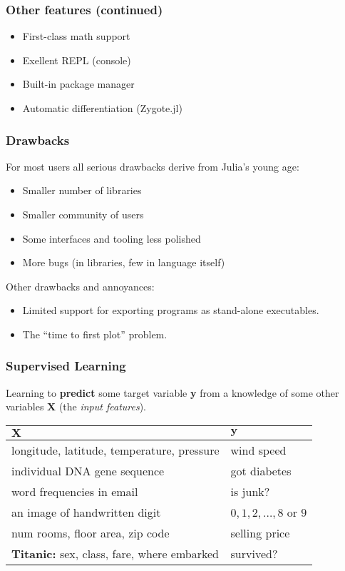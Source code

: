 \documentclass[t]{beamer}
\newcommand\df{\bf\color{Maroon}}
\begin{document}
\begin{frame}
  \frametitle{Other features (continued)}
  \begin{itemize}
  \item First-class math support
    \item Exellent REPL (console)
    \item Built-in package manager
    \item Automatic differentiation (Zygote.jl)
  \end{itemize}
\end{frame}

\begin{frame}
  \frametitle{Drawbacks}
  For most users all serious drawbacks derive from Julia's young age:
  \begin{itemize}
     \item Smaller number of libraries
     \item Smaller community of users
     \item Some interfaces and tooling less polished
     \item More bugs (in libraries, few in language itself)
  \end{itemize}
  Other drawbacks and annoyances:
  \begin{itemize}
     \item Limited support for exporting programs as stand-alone executables.
     \item The ``time to first plot'' problem.
  \end{itemize}
\end{frame}



\fi

\begin{frame}
  \frametitle{Supervised Learning}
  Learning to {\df predict} some target variable {\df\large y} from a
  knowledge of some other variables {\df \large X} (the {\it input features}).\pause
  \begin{table}
  \begin{tabular}{|l|l|}
    \hline
    ${\mathbf X}$  & ${\mathbf y}$ \\ \hline
    longitude, latitude, temperature, pressure & wind speed \\
    individual DNA gene sequence & got diabetes\\
    word frequencies in email & is junk? \\
    an image of handwritten digit & $0, 1, 2, \ldots, 8$ or $9$ \\
    num rooms, floor area, zip code & selling price \\
    {\bf Titanic:} sex, class, fare, where embarked & survived? \\
    \hline
  \end{tabular}
  \end{table}
\end{frame}
\end{document}
